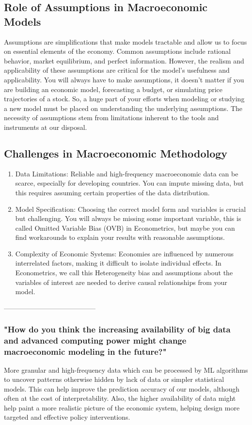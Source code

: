 \documentclass[10pt]{article}
\begin{document}
\subsection*{Role of Assumptions in Macroeconomic Models}
Assumptions are simplifications that make models tractable and allow us to focus on essential elements of the economy. Common assumptions include rational behavior, market equilibrium, and perfect information. However, the realism and applicability of these assumptions are critical for the model's usefulness and applicability. You will always have to make assumptions, it doesn't matter if you are building an economic model, forecasting a budget, or simulating price trajectories of a stock. So, a huge part of your efforts when modeling or studying a new model must be placed on understanding the underlying assumptions. The necessity of assumptions stem from limitations inherent to the tools and instruments at our disposal.

\subsection*{Challenges in Macroeconomic Methodology}
\begin{enumerate}
  \item Data Limitations: Reliable and high-frequency macroeconomic data can be scarce, especially for developing countries. You can impute missing data, but this requires assuming certain properties of the data distribution.

  \item Model Specification: Choosing the correct model form and variables is crucial but challenging. You will always be missing some important variable, this is called Omitted Variable Bias (OVB) in Econometrics, but maybe you can find workarounds to explain your results with reasonable assumptions.

  \item Complexity of Economic Systems: Economies are influenced by numerous interrelated factors, making it difficult to isolate individual effects. In Econometrics, we call this Heterogeneity bias and assumptions about the variables of interest are needed to derive causal relationships from your model.
\end{enumerate}

-----------------------------------------
\subsubsection*{"How do you think the increasing availability of big data and advanced computing power might change macroeconomic modeling in the future?"}
More granular and high-frequency data which can be processed by ML algorithms to uncover patterns otherwise hidden by lack of data or simpler statistical models. This can help improve the prediction accuracy of our models, although often at the cost of interpretability. Also, the higher availability of data might help paint a more realistic picture of the economic system, helping design more targeted and effective policy interventions.
\end{document}
